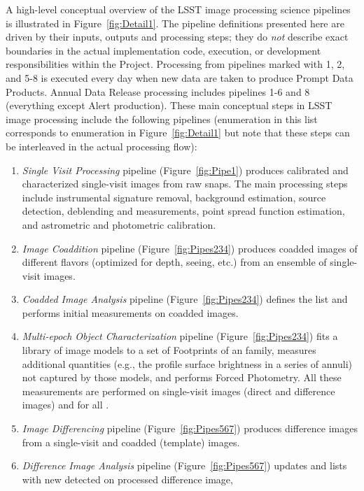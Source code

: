 \documentclass[SE,lsstdraft,toc]{lsstdoc}
\begin{document}
A high-level conceptual overview of the LSST image processing science pipelines is illustrated
in Figure~\ref{fig:Detail1}. The pipeline definitions presented here are driven by their inputs,
outputs and processing steps; they do \textit{not} describe exact boundaries in the actual implementation
code, execution, or development responsibilities within the Project.
Processing from pipelines marked with 1, 2, and 5-8 is executed every day when new data are taken
to produce Prompt Data Products. Annual Data Release processing includes pipelines 1-6 and 8
(everything except Alert production). These main conceptual steps in LSST image processing
include the following pipelines (enumeration in this list corresponds to enumeration in Figure~\ref{fig:Detail1}
but note that these steps can be interleaved in the actual processing flow):
\begin{enumerate}
\item \textit{Single Visit Processing} pipeline (Figure~\ref{fig:Pipe1}) produces calibrated and
characterized single-visit images from raw snaps. The main processing steps include instrumental
signature removal, background estimation, source detection, deblending and measurements,
point spread function estimation, and astrometric and photometric calibration.
\item \textit{Image Coaddition} pipeline (Figure~\ref{fig:Pipes234}) produces coadded images
of different flavors (optimized for depth, seeing, etc.) from an ensemble of single-visit images.
\item \textit{Coadded Image Analysis} pipeline (Figure~\ref{fig:Pipes234}) defines the \Object list
and performs initial measurements on coadded images.
\item \textit{Multi-epoch Object Characterization} pipeline (Figure~\ref{fig:Pipes234}) fits a library
of image models to a set of Footprints of an \Object family, measures additional quantities (e.g.,
the profile surface brightness in a series of annuli) not captured by those models, and performs
Forced Photometry. All these measurements are performed on single-visit images (direct and
difference images) and for all \Objects.
\item \textit{Image Differencing} pipeline (Figure~\ref{fig:Pipes567}) produces difference images
from a single-visit and coadded (template) images.
\item \textit{Difference Image Analysis} pipeline (Figure~\ref{fig:Pipes567}) updates
\DIAObject and \SSObject lists with new \DIASources detected on processed difference image,

\end{enumerate}
\end{document}
